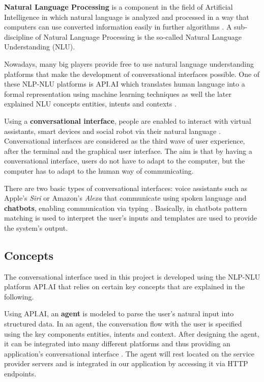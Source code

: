 \textbf{Natural Language Processing} is a component in the field of Artificial Intelligence in which natural language is analyzed and processed in a way that computers can use converted information easily in further algorithms \cite{collobert08}. A sub-discipline of Natural Language Processing is the so-called Natural Language Understanding (NLU).

Nowadays, many big players provide free to use natural language understanding platforms that make the development of conversational interfaces possible. One of these NLP-NLU platforms is API.AI which translates human language into a formal representation using machine learning techniques as well the later explained NLU concepts entities, intents and contexts \cite{apiai:concepts}.

Using a \textbf{conversational interface}, people are enabled to interact with virtual assistants, smart devices and social robot via their natural language \cite{mctear16}. Conversational interfaces are considered as the third wave of user experience, after the terminal and the graphical user interface. The aim is that by having a conversational interface, users do not have to adapt to the computer, but the computer has to adapt to the human way of communicating.

There are two basic types of conversational interfaces: voice assistants such as Apple's \textit{Siri} or Amazon's \textit{Alexa} that communicate using spoken language and \textbf{chatbots}, enabling communication via typing \cite{fastcodedesign:conversationalinterface}. Basically, in chatbots pattern matching is used to interpret the user's inputs and templates are used to provide the system's output.
 

\subsection{Concepts}

The conversational interface used in this project is developed using the NLP-NLU platform API.AI that relies on certain key concepts that are explained in the following.

Using API.AI, an \textbf{agent} is modeled to parse the user’s natural input into structured data. In an agent, the conversation flow with the user is specified using the key components entities, intents and context. After designing the agent, it can be integrated into many different platforms and thus providing an application’s conversational interface \cite{apiai:agents}. The agent will rest located on the service provider servers and is integrated in our application by accessing it via HTTP endpoints.

